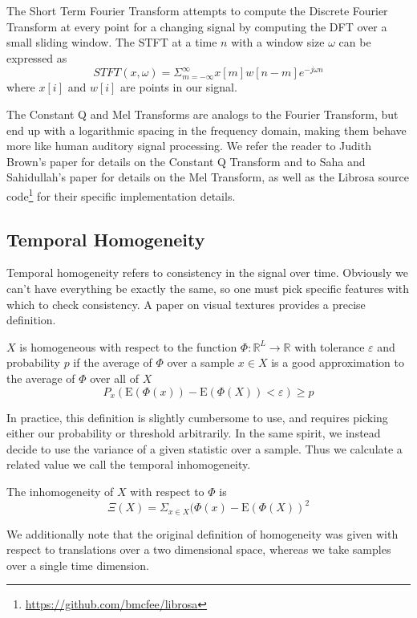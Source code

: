 \documentclass{sig-alternate-05-2015}
\let\realbfseries=\bfseries
\def\bfseries{\realbfseries\boldmath}
\newenvironment{definition}[1][Definition]{\begin{trivlist}
\item[\hskip \labelsep {\bfseries #1}]}{\end{trivlist}}
\let\epsilon=\varepsilon
\begin{document}
The Short Term Fourier Transform attempts to compute the Discrete Fourier Transform at every point for a changing signal by computing the DFT over a small sliding window. The STFT at a time $n$ with a window size $\omega$ can be expressed as $$STFT(x,\omega) = \Sigma_{m=-\infty}^\infty x[m]w[n-m]e^{-j\omega n}$$ where $x[i]$ and $w[i]$ are points in our signal\cite{STFT}.

The Constant Q and Mel Transforms are analogs to the Fourier Transform, but end up with a logarithmic spacing in the frequency domain, making them behave more like human auditory signal processing. We refer the reader to Judith Brown's paper\cite{brown1991calculation} for details on the Constant Q Transform and to Saha and Sahidullah's paper\cite{Sahidullah2012543} for details on the Mel Transform, as well as the Librosa source code\footnote{\url{https://github.com/bmcfee/librosa}} for their specific implementation details.



\subsection{Temporal Homogeneity}
Temporal homogeneity refers to consistency in the signal over time. Obviously we can't have everything be exactly the same, so one must pick specific features with which to check consistency. A paper on visual textures provides a precise definition\cite{portilla2000parametric}.
\begin{definition}
$X$ is homogeneous with respect to the function $\Phi: \mathbb{R}^L \rightarrow \mathbb{R}$ with tolerance $\epsilon$ and probability $p$ if the average of $\Phi$ over a sample $x \in X$ is a good approximation to the average of $\Phi$ over all of $X$ 
$$P_x(\mathrm{E}(\Phi(x)) - \mathrm{E}(\Phi(X)) < \epsilon) \geq p$$
\end{definition}
In practice, this definition is slightly cumbersome to use, and requires picking either our probability or threshold arbitrarily. In the same spirit, we instead decide to use the variance of a given statistic over a sample. Thus we calculate a related value we call the temporal inhomogeneity. 
\begin{definition}
The inhomogeneity of $X$ with respect to $\Phi$ is $$\Xi(X) = \Sigma_{x\in X} (\Phi(x) - \mathrm{E}(\Phi(X))^2$$
\end{definition}
We additionally note that the original definition of homogeneity was given with respect to translations over a two dimensional space, whereas we take samples over a single time dimension.
\end{document}
